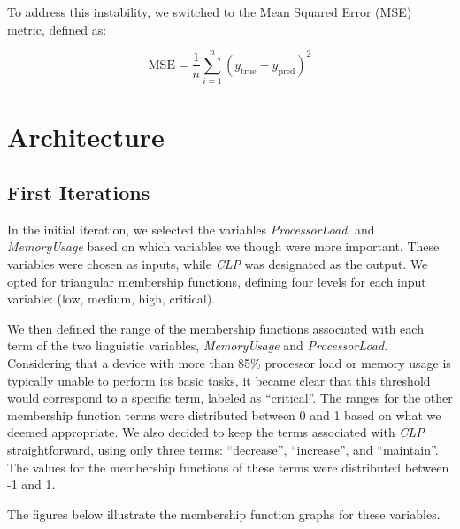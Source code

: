 \documentclass[titlepage]{article}
\begin{document}
To address this instability, we switched to the Mean Squared Error (MSE) metric, defined as:

\[
    \text{MSE} = \frac{1}{n} \sum_{i=1}^{n} (y_{\text{true}} - y_{\text{pred}})^2
\]

\section{Architecture}
\subsection{First Iterations}
\label{sec:first_iterations}

In the initial iteration, we selected the variables \textit{ProcessorLoad}, and \textit{MemoryUsage} based on which variables we though were more important.
These variables were chosen as inputs, while \textit{CLP} was designated as the output.
We opted for triangular membership functions, defining four levels for each input variable: (low, medium, high, critical).

We then defined the range of the membership functions associated with each term of the two linguistic variables, \textit{MemoryUsage} and \textit{ProcessorLoad}.
Considering that a device with more than 85\% processor load or memory usage is typically unable to perform its basic tasks,
it became clear that this threshold would correspond to a specific term, labeled as ``critical''.
The ranges for the other membership function terms were distributed between 0 and 1 based on what we deemed appropriate.
We also decided to keep the terms associated with \textit{CLP} straightforward, using only three terms: ``decrease'', ``increase'', and ``maintain''.
The values for the membership functions of these terms were distributed between -1 and 1.

The figures below illustrate the membership function graphs for these variables.
\end{document}
